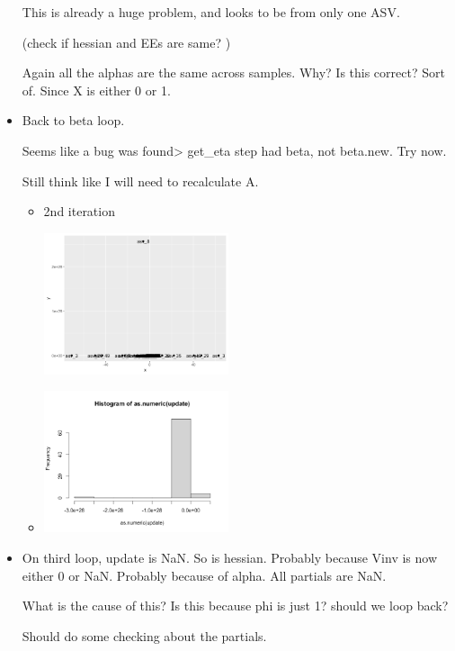 \documentclass[10pt]{article}
\theoremstyle{definition}
\begin{document}
\begin{itemize}
This is already a huge problem, and looks to be from only one ASV.

(check if hessian and EEs are same? )

Again all the alphas are the same across samples. Why? Is this correct? Sort of. Since X is either 0 or 1.

\item Back to beta loop.

Seems like a bug was found> get\_eta step had beta, not beta.new. Try now.

Still think like I will need to recalculate A.

\begin{itemize}
  \item 2nd iteration


	\includegraphics[width=0.45\textwidth]{img/Spring_2022_Journal-2025a7a8.png}



\item
	\includegraphics[width=0.45\textwidth]{img/Spring_2022_Journal-0491c15a.png}

\end{itemize}


\item On third loop, update is NaN. So is hessian. Probably because Vinv is now either 0 or NaN. Probably because of alpha. All partials are NaN.


What is the cause of this? Is this because phi is just 1? should we loop back?

Should do some checking about the partials.


\end{itemize}
\end{document}
